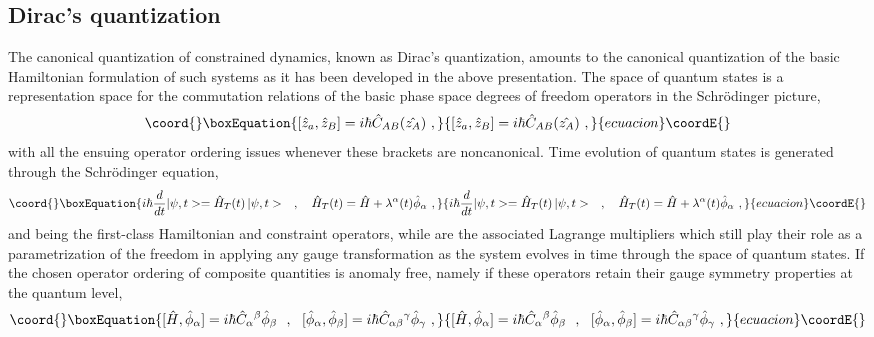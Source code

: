 \documentclass[a4paper,11pt]{article}
\begin{document}
\subsection{Dirac's quantization}
\label{Subsect5.4}

The canonical quantization of constrained dynamics, known as Dirac's 
quantization,\cite{Dirac} amounts to the canonical quantization
of the basic Hamiltonian formulation of such systems as it has been
developed in the above presentation.\cite{JG1} The space of quantum states 
\myHighlight{$|\psi>$}\coordHE{} is a representation space for the commutation relations of the basic
phase space degrees of freedom operators \coordHE{} in the Schr\"odinger
picture,
\begin{equation}\coord{}\boxEquation{
[\hat{z}_a,\hat{z}_B]=i\hbar\hat{C}_{AB}(\hat{z_A})\ ,
}{
[\hat{z}_a,\hat{z}_B]=i\hbar\hat{C}_{AB}(\hat{z_A})\ ,
}{ecuacion}\coordE{}\end{equation}
with all the ensuing operator ordering issues whenever these brackets
are noncanonical. Time evolution of quantum states \coordHE{} is generated 
through the Schr\"odinger equation,
\begin{equation}\coord{}\boxEquation{
i\hbar\frac{d}{dt}|\psi,t>=\hat{H}_T(t)\,|\psi,t>\ \ \ ,\ \ \ 
\hat{H}_T(t)=\hat{H}+\lambda^\alpha(t)\hat{\phi}_\alpha\ ,
}{
i\hbar\frac{d}{dt}|\psi,t>=\hat{H}_T(t)\,|\psi,t>\ \ \ ,\ \ \ 
\hat{H}_T(t)=\hat{H}+\lambda^\alpha(t)\hat{\phi}_\alpha\ ,
}{ecuacion}\coordE{}\end{equation}
\myHighlight{$\hat{H}$}\coordHE{} and \myHighlight{$\hat{\phi}_\alpha$}\coordHE{} being the first-class Hamiltonian
and constraint operators, while \coordHE{} are the associated
Lagrange multipliers which still play their role as a parametrization of
the freedom in applying any gauge transformation as the system evolves 
in time through the space of quantum states. If the chosen operator ordering 
of composite quantities is anomaly free, namely if these operators retain 
their gauge symmetry properties at the quantum level,
\begin{equation}\coord{}\boxEquation{
[\hat{H},\hat{\phi}_\alpha]=i\hbar{{\hat{C}}_\alpha}{}^\beta\hat{\phi}_\beta
\ \ ,\ \ 
[\hat{\phi}_\alpha,\hat{\phi}_\beta]=i\hbar{{\hat{C}}_{\alpha\beta}}{}^\gamma
\hat{\phi}_\gamma\ ,
}{
[\hat{H},\hat{\phi}_\alpha]=i\hbar{{\hat{C}}_\alpha}{}^\beta\hat{\phi}_\beta
\ \ ,\ \ 
[\hat{\phi}_\alpha,\hat{\phi}_\beta]=i\hbar{{\hat{C}}_{\alpha\beta}}{}^\gamma
\hat{\phi}_\gamma\ ,
}{ecuacion}\coordE{}\end{equation}
\end{document}
